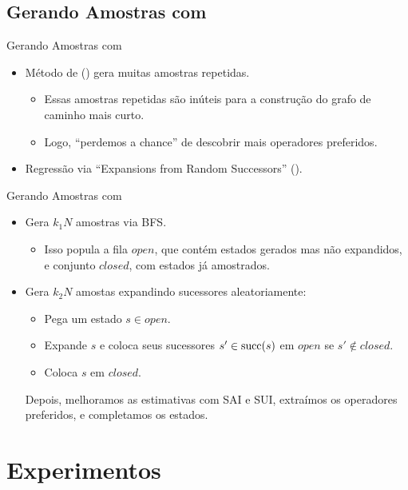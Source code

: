 \documentclass{beamer}
\begin{document}
\subsection{Gerando Amostras com \bfsrs}
\begin{frame}{Gerando Amostras com \bfsrs}
\begin{itemize}
  \item Método de \cite{Bettker.etal/2022} (\bfsrw) gera muitas \alert{amostras repetidas}.
  \begin{itemize}
    \item Essas amostras repetidas são inúteis para a construção do grafo de caminho mais curto.
    \item Logo, ``perdemos a chance'' de descobrir mais operadores preferidos.
  \end{itemize}
  \pause
  \item Regressão via ``\alert{Expansions from Random Successors}'' (\alert{\bfsrs}).
\end{itemize}
\end{frame}

\begin{frame}{Gerando Amostras com \bfsrs}
\begin{itemize}
  \item Gera $k_{1}N$ amostras via \alert{BFS}.
  \begin{itemize}
    \item Isso popula a fila \alert{$open$}, que contém estados gerados mas não expandidos, e conjunto \alert{$closed$}, com estados já amostrados.
  \end{itemize}
  \pause
  \item Gera $k_{2}N$ amostas \alert{expandindo sucessores aleatoriamente}:
  \begin{itemize}
    \item Pega um estado $s \in open$.
    \pause
    \item Expande $s$ e coloca seus sucessores $s' \in \operatorname{succ}(s)$ em $open$ se $s' \notin closed$.
    \pause
    \item Coloca $s$ em $closed$.
  \end{itemize}
\pause
\vspace{1.0cm}
Depois, melhoramos as estimativas com SAI e SUI, extraímos os operadores preferidos, e completamos os estados.
\end{itemize}
\end{frame}


\section{Experimentos}
\end{document}
